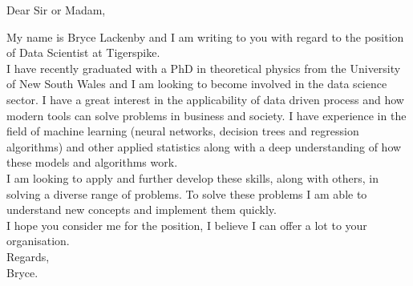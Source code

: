 \documentclass{letter}
\begin{document}
	\begin{letter}
		{}
	\opening{Dear Sir or Madam,}
	My name is Bryce Lackenby and I am writing to you with regard to the position of Data Scientist at Tigerspike.\\

	I have recently graduated with a PhD in theoretical physics from the University of New South Wales and I am looking to become involved in the data science sector. I have a great interest in the applicability of data driven process and how modern tools can solve problems in business and society. I have experience in the field of machine learning (neural networks, decision trees and regression algorithms) and other applied statistics along with a deep understanding of how these models and algorithms work.\\

	I am looking to apply and further develop these skills, along with others, in solving a diverse range of problems. To solve these problems I am able to understand new concepts and implement them quickly.\\

	I hope you consider me for the position, I believe I can offer a lot to your organisation. \\

  Regards, \\
  Bryce.
	\end{letter}
\end{document}

